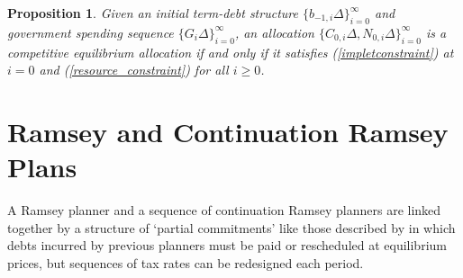 \documentclass[12pt]{article}
\newtheorem{proposition}{Proposition}
\begin{document}

\begin{proposition}\label{propo::1}
	Given an initial  term-debt  structure  $\{b_{-1, i}\Delta\}_{i=0}^\infty$ and government spending sequence $\{G_{i}\Delta\}_{i=0}^\infty$, an allocation $\{C_{0, i}\Delta, N_{0, i}\Delta\}_{i=0}^\infty$ is a competitive equilibrium allocation if and only if it satisfies  (\ref{impletconstraint}) at $i=0$ and  (\ref{resource_constraint}) for all $i\geq 0$. %
\end{proposition}


\section{Ramsey  and Continuation Ramsey Plans\label{sec:RamseycontRamsey}}

A Ramsey planner and a sequence of continuation Ramsey planners are linked together by a  structure of `partial commitments'  like those described by \citet[p.~69]{LucasStokey1983} in which debts incurred by previous planners must be paid or rescheduled at equilibrium prices, but sequences of tax rates can be redesigned each period. 
\end{document}

